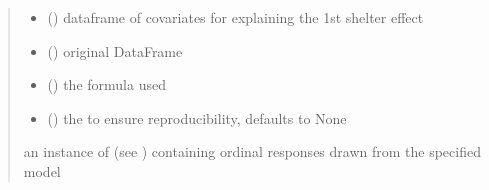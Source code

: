 \documentclass[letterpaper,10pt,english]{sphinxmanual}
\begin{document}
\begin{fulllineitems}
\begin{quote}
\begin{description}
\begin{itemize}
\item {} 
\sphinxAtStartPar
{} () \textendash{} dataframe of covariates for explaining the 1st shelter effect

\item {} 
\sphinxAtStartPar
{} () \textendash{} original DataFrame

\item {} 
\sphinxAtStartPar
{} () \textendash{} the formula used

\item {} 
\sphinxAtStartPar
{} (\sphinxstyleliteralemphasis{\sphinxupquote{, }}) \textendash{} the  to ensure reproducibility, defaults to None

\end{itemize}

\sphinxAtStartPar
an instance of  (see ) containing ordinal responses drawn from the specified model

\end{description}\end{quote}

\end{fulllineitems}

\end{document}
